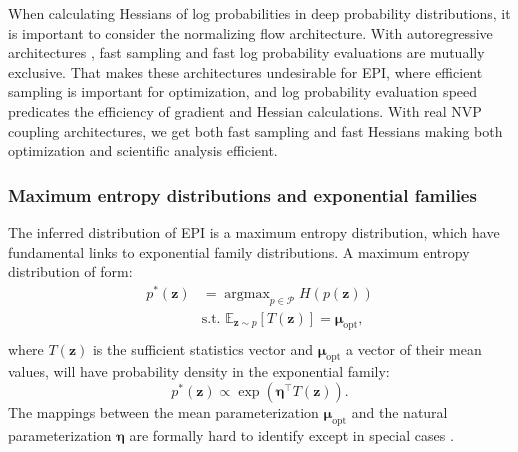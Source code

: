 \documentclass[11pt]{article}
\DeclareMathOperator*{\argmax}{argmax}
\begin{document}
When calculating Hessians of log probabilities in deep probability distributions, it is important to consider the normalizing flow architecture.
With autoregressive architectures \cite{kingma2016improved, papamakarios2017masked}, fast sampling and fast log probability evaluations are mutually exclusive.
That makes these architectures undesirable for EPI, where efficient sampling is important for optimization, and log probability evaluation speed predicates the efficiency of gradient and Hessian calculations.
With real NVP coupling architectures, we get both fast sampling and fast Hessians making both optimization and scientific analysis efficient.

\subsubsection{Maximum entropy distributions and exponential families}\label{methods_ME_EF}
The inferred distribution of EPI is a maximum entropy distribution, which have fundamental links to exponential family distributions. 
A maximum entropy distribution of form:
\begin{equation} \label{eq:max_ent}
\begin{split}
p^*(\mathbf{z}) &= \argmax_{p \in \mathcal{P}} H(p(\mathbf{z})) \\
 &  \text{s.t.  } \mathbb{E}_{\mathbf{z} \sim p}\left[T(\mathbf{z})\right] = \bm{\mu}_{\text{opt}}, \\
 \end{split}
\end{equation} 
where $T(\mathbf{z})$ is the sufficient statistics vector and $\bm{\mu}_{\text{opt}}$ a vector of their mean values, will have probability density in the exponential family:
\begin{equation}
p^*(\mathbf{z}) \propto \exp(\bm{\eta}^\top T(\textbf{z})).
\end{equation}
The mappings between the mean parameterization $\bm{\mu}_{\text{opt}}$ and the natural parameterization $\bm{\eta}$ are formally hard to identify except in special cases \cite{wainwright2008graphical}.
\end{document}
